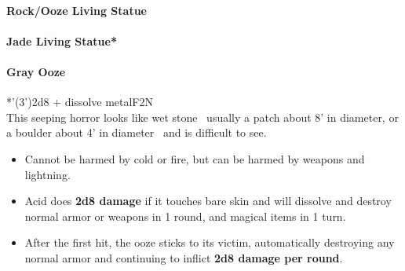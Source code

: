 \documentclass[english,11pt,openany,letterpaper,twocolumn]{book}
\begin{document}
\paragraph{Rock/Ooze Living Statue}
\vspace*{-\baselineskip}
\paragraph{Jade Living Statue*}



\hypertarget{gray-ooze}{}
\paragraph{Gray Ooze}
*'(3')\tab 2d8 + dissolve metal\tab F2\tab N\\

This seeping horror looks like wet stone \dash\ usually a patch about 8' in diameter, or a boulder about 4' in diameter \dash\ and is difficult to see.

\begin{itemize}[leftmargin=*,label=\itshape\textbullet]
	\item
	Cannot be harmed by cold or fire, but can be harmed by weapons and lightning.
	\item
	Acid does \textbf{2d8 damage} if it touches bare skin and will dissolve and destroy normal armor or weapons in 1 round, and magical items in 1 turn.
	\item
	After the first hit, the ooze sticks to its victim, automatically destroying any normal armor and continuing to inflict \textbf{2d8 damage per round}.
\end{itemize}
\end{document}
